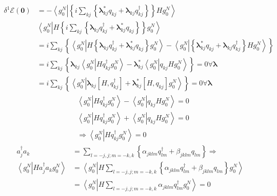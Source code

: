 \documentclass[aps,preprint]{revtex4}%
\begin{document}
\begin{align}
\delta^{1}\mathcal{E}\left(  \mathbf{0}\right)   &  =-\left\langle g_{0}%
^{N}\right.  \left\vert \left\{  i\sum_{kj}\left\{  \mathbf{\lambda}%
_{kj}^{\ast}q_{kj}+\mathbf{\lambda}_{kj}q_{kj}^{\dagger}\right\}  \right\}
Hg_{0}^{N}\right\rangle \\
&  \left\langle g_{0}^{N}\right.  \left\vert H\left\{  i\sum_{kj}\left\{
\mathbf{\lambda}_{kj}q_{kj}^{\dagger}+\mathbf{\lambda}_{kj}^{\ast}%
q_{kj}\right\}  \right\}  g_{0}^{N}\right\rangle \\
&  =i\sum_{kj}\left\{  \left\langle g_{0}^{N}\right.  \left\vert H\left\{
\mathbf{\lambda}_{kj}q_{kj}^{\dagger}+\mathbf{\lambda}_{kj}^{\ast}%
q_{kj}\right\}  g_{0}^{N}\right\rangle -\left\langle g_{0}^{N}\right.
\left\vert \left\{  \mathbf{\lambda}_{kj}^{\ast}q_{kj}+\mathbf{\lambda}%
_{kj}q_{kj}^{\dagger}\right\}  Hg_{0}^{N}\right\rangle \right\} \\
&  =i\sum_{kj}\left\{  \mathbf{\lambda}_{kj}\left\langle g_{0}^{N}\right.
\left\vert Hq_{kj}^{\dagger}g_{0}^{N}\right\rangle -\mathbf{\lambda}%
_{kj}^{\ast}\left\langle g_{0}^{N}\right.  \left\vert q_{kj}Hg_{0}%
^{N}\right\rangle \right\}  =0\forall\mathbf{\lambda}\\
&  =i\sum_{kj}\left\{  \left\langle g_{0}^{N}\right.  \left\vert
\mathbf{\lambda}_{kj}\left[  H,q_{kj}^{\dagger}\right]  +\mathbf{\lambda}%
_{kj}^{\ast}\left[  H,q_{kj}\right]  g_{0}^{N}\right\rangle \right\}
=0\forall\mathbf{\lambda}%
\end{align}%
\begin{align}
&  \left\langle g_{0}^{N}\right.  \left\vert Hq_{kj}^{\dagger}g_{0}%
^{N}\right\rangle -\left\langle g_{0}^{N}\right.  \left\vert q_{kj}Hg_{0}%
^{N}\right\rangle =0\\
&  \left\langle g_{0}^{N}\right.  \left\vert Hq_{kj}^{\dagger}g_{0}%
^{N}\right\rangle +\left\langle g_{0}^{N}\right.  \left\vert q_{kj}Hg_{0}%
^{N}\right\rangle =0\\
&  \Rightarrow\left\langle g_{0}^{N}\right.  \left\vert Hq_{kj}^{\dagger}%
g_{0}^{N}\right\rangle =0
\end{align}%
\begin{align}
a_{j}^{\dagger}a_{k}  &  =\sum_{l=-j,j;m=-k,k}\left\{  \alpha_{jklm}%
q_{lm}^{\dagger}+\beta_{jklm}q_{lm}\right\}  \Rightarrow\\
\left\langle g_{0}^{N}\right.  \left\vert Ha_{j}^{\dagger}a_{k}g_{0}%
^{N}\right\rangle  &  =\left\langle g_{0}^{N}\right.  \left\vert
H\sum_{l=-j,j;m=-k,k}\left\{  \alpha_{jklm}q_{lm}^{\dagger}+\beta_{jklm}%
q_{lm}\right\}  g_{0}^{N}\right\rangle \\
&  =\left\langle g_{0}^{N}\right.  \left\vert H\sum_{l=-j,j;m=-k,k}%
\alpha_{jklm}q_{lm}^{\dagger}g_{0}^{N}\right\rangle =0
\end{align}
\end{document}
